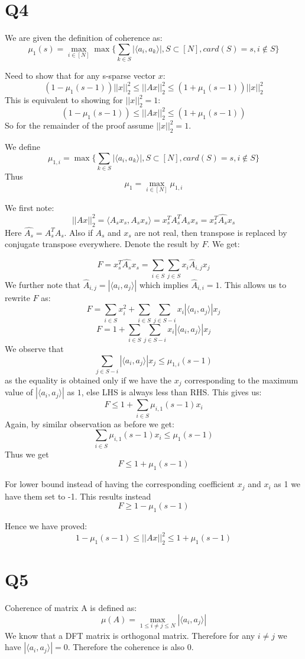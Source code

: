 \documentclass{article}
\begin{document}
\section{Q4}
We are given the definition of coherence as:
$$\mu_1(s)  = \max_{i \in [N]} \max \{\sum_{k \in S} |\langle a_i, a_k \rangle|, S \subset [N], card(S) = s, i \notin S \}$$

Need to show that for any s-sparse vector $x$:
$$(1 - \mu_1(s - 1)) ||x||_2^2 \le ||Ax||_2^2 \le (1 + \mu_1(s-1)) ||x||_2^2$$
This is equivalent to showing for $||x||_2^2 = 1$:
$$(1 - \mu_1(s - 1)) \le ||Ax||_2^2 \le (1 + \mu_1(s-1))$$
So for the remainder of the proof assume $||x||_2^2 = 1$.

We define
$$\mu_{1,i} = \max \{\sum_{k \in S} |\langle a_i, a_k \rangle|, S \subset [N], card(S) = s, i \notin S \}$$
Thus
$$\mu_1 = \max_{i \in [N]} \mu_{1,i}$$

We first note:
$$||Ax||_2^2 = \langle A_sx_s, A_sx_s \rangle = x_s^T A_s^TA_s x_s = x_s^T \hat{A_s} x_s $$
Here $\hat{A_s} = A_s^T A_s$. Also if $A_s$ and $x_s$ are not real, then transpose is replaced by conjugate transpose everywhere. Denote the result by $F$. We get:

$$F = x_s^T \hat{A_s} x_s = \sum_{i \in S} \sum_{j \in S} x_i \hat{A}_{i, j} x_j$$
We further note that $\hat{A}_{i, j} = |\langle a_i, a_j \rangle|$ which implies $\hat{A}_{i, i} = 1$. This allows us to rewrite $F$ as:
$$F = \sum_{i \in S}x_i^2 + \sum_{i \in S} \sum_{j \in S - i} x_i |\langle a_i, a_j \rangle| x_j$$
$$F = 1 + \sum_{i \in S} \sum_{j \in S - i} x_i |\langle a_i, a_j \rangle| x_j$$
We observe that $$\sum_{j \in S - i}|\langle a_i, a_j \rangle| x_j \le \mu_{1,i}(s - 1)$$ as the equality is obtained only if we have the $x_j$ corresponding to the maximum value of $|\langle a_i, a_j \rangle|$ as $1$, else LHS is always less than RHS. This gives us:
$$F \le 1 + \sum_{i \in S} \mu_{i, 1}(s - 1) x_i$$
Again, by similar observation as before we get:
$$\sum_{i \in S} \mu_{i, 1}(s - 1) x_i \le  \mu_1(s-1)$$
Thus we get
$$F \le 1 + \mu_1(s -1)$$

For lower bound instead of having the corresponding coefficient $x_j$ and $x_i$ as 1 we have them set to -1. This results instead
$$F \ge 1 - \mu_1(s-1)$$

Hence we have proved:
$$1 - \mu_1(s-1) \le ||Ax||_2^2 \le 1 + \mu_1(s-1)$$

\section{Q5}
Coherence of matrix A is defined as:
$$\mu(A) = \max_{1 \le i \ne j \le N} |\langle a_i, a_j \rangle|$$
We know that a DFT matrix is orthogonal  matrix. Therefore for any $i \ne j$ we have $|\langle a_i, a_j \rangle| = 0$. Therefore the coherence is also 0.
\end{document}
